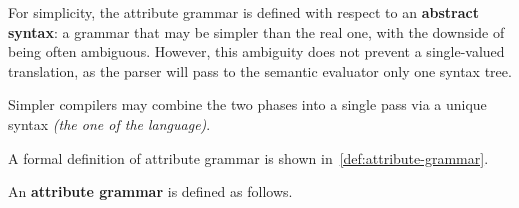 \documentclass[english]{article}
\begin{document}
For simplicity, the attribute grammar is defined with respect to an \textbf{abstract syntax}:
a grammar that may be simpler than the real one, with the downside of being often ambiguous.
However, this ambiguity does not prevent a single-valued translation, as the parser will pass to the semantic evaluator only one syntax tree.

Simpler compilers may combine the two phases into a single pass via a unique syntax \textit{(the one of the language)}.

\bigskip
A formal definition of attribute grammar is shown in~\ref{def:attribute-grammar}.

\begin{definition}
  \label{def:attribute-grammar}
  An \textbf{attribute grammar} is defined as follows.


\end{definition}
\end{document}
